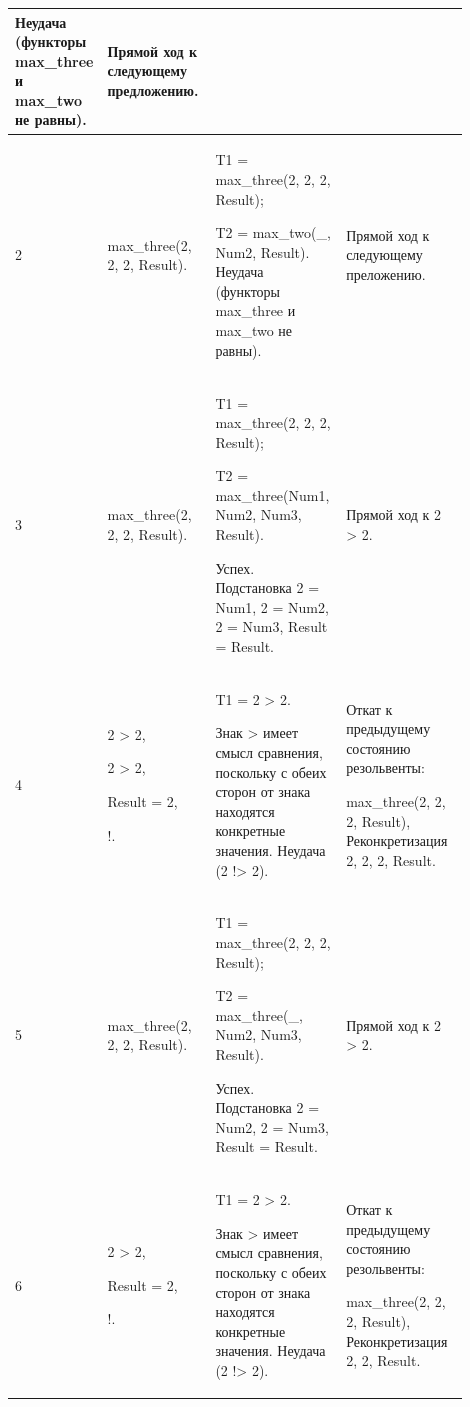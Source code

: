 \documentclass[a4paper,12pt]{article}
\begin{document}
\begin{center}
\begin{longtable}[h!]{|p{0.05\linewidth}|p{0.25\linewidth}|p{ 0.3\linewidth}|p{ 0.3\linewidth}|}
{		Неудача (функторы max\_three и max\_two не равны).} & {Прямой ход к следующему предложению.}\\

			\hline

			{2} & {max\_three(2, 2, 2, Result).} & {T1 = max\_three(2, 2, 2, Result);

			

		T2 = max\_two(\_, Num2, Result). Неудача (функторы max\_three и max\_two не равны).} & {Прямой ход к следующему преложению.}\\

			\hline

			{3} & {max\_three(2, 2, 2, Result).} & {T1 = max\_three(2, 2, 2, Result);

			

		T2 = max\_three(Num1, Num2, Num3, Result).

	

Успех. Подстановка 2 = Num1, 2 = Num2, 2 = Num3, Result = Result.} & {Прямой ход к 2 > 2.}\\

			\hline

			{4} & {2 > 2,

			

		2 > 2,

	

Result = 2,

!.} & {T1 = 2 > 2.

Знак > имеет смысл сравнения, поскольку с обеих сторон от знака находятся конкретные значения. Неудача (2 !> 2).} & {Откат к предыдущему состоянию резольвенты: 

max\_three(2, 2, 2, Result), Реконкретизация 2, 2, 2, Result.}\\
			\hline
			{5} & {max\_three(2, 2, 2, Result).} & {T1 = max\_three(2, 2, 2, Result);
				
				T2 = max\_three(\_, Num2, Num3, Result).
				
				Успех. Подстановка 2 = Num2, 2 = Num3, Result = Result.} & {Прямой ход к 2 > 2.}\\
			\hline
			{6} & {2 > 2,
				
				Result = 2,
				
				!.} & {T1 = 2 > 2.
				
				Знак > имеет смысл сравнения, поскольку с обеих сторон от знака находятся конкретные значения. Неудача (2 !> 2).} & {Откат к предыдущему состоянию резольвенты: 
				
				max\_three(2, 2, 2, Result), Реконкретизация 2, 2, Result.}\\


\end{longtable}
\end{center}
\end{document}
